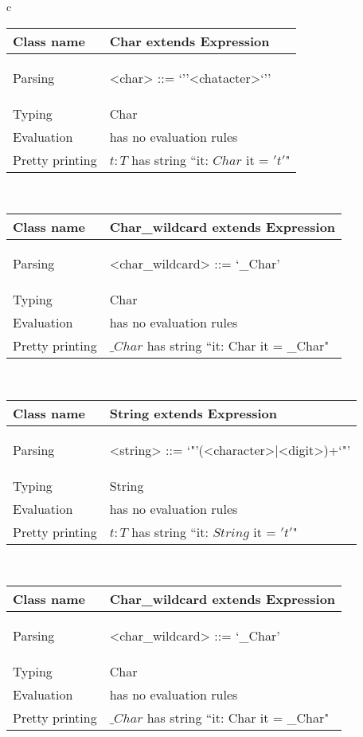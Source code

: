 \documentclass[12pt]{article}
\begin{document}
\begin{tabular}{c}


\begin{tabular}{|l|p{15cm}|}
\hline
Class name & Char extends Expression \\
\hline
Parsing & 
\begin{grammar}
<char> ::=  `''<chatacter>`''
\end{grammar}  \\
\hline
Typing &  Char
\\
\hline
Evaluation &  has no evaluation rules \\
\hline
Pretty printing &  $t:T$  has string  ``it: $Char$   it = $'t'$" \\
\hline
\end{tabular} 

\\

\begin{tabular}{|l|p{15cm}|}
\hline
\hline
Class name & Char_wildcard extends Expression \\
\hline
Parsing & 
\begin{grammar}
<char_wildcard> ::=  `_Char'
\end{grammar}  \\
\hline
Typing &  Char
\\
\hline
Evaluation &  has no evaluation rules \\
\hline
Pretty printing &  $\_Char$  has string  ``it: Char it = _Char" \\
\hline
\end{tabular} 

\\

\begin{tabular}{|l|p{15cm}|}
\hline
Class name & String extends Expression \\
\hline
Parsing & 
\begin{grammar}
<string> ::=  `"'(<character>|<digit>)+`"'
\end{grammar}  \\
\hline
Typing &  String
\\
\hline
Evaluation &  has no evaluation rules \\
\hline
Pretty printing &  $t:T$  has string  ``it: $String$   it = $'t'$" \\
\hline
\end{tabular} 

\\

\begin{tabular}{|l|p{15cm}|}
\hline
\hline
Class name & Char_wildcard extends Expression \\
\hline
Parsing & 
\begin{grammar}
<char_wildcard> ::=  `_Char'
\end{grammar}  \\
\hline
Typing &  Char
\\
\hline
Evaluation &  has no evaluation rules \\
\hline
Pretty printing &  $\_Char$  has string  ``it: Char it = _Char" \\
\hline
\end{tabular} 


\end{tabular}
\end{document}
